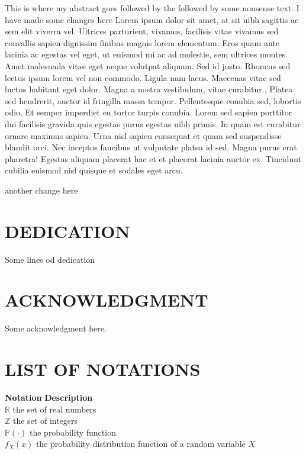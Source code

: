 \documentclass{source/tex/templates/maththesis}
\begin{document}
This is where my abstract goes followed by the followed by some nonsense text. I have made some changes here Lorem ipsum dolor sit amet, at sit nibh sagittis ac sem elit viverra vel. Ultrices parturient, vivamus, facilisis vitae vivamus sed convallis sapien dignissim finibus magnis lorem elementum. Eros quam ante lacinia ac egestas vel eget, ut euismod mi ac ad molestie, sem ultrices montes. Amet malesuada vitae eget neque volutpat aliquam. Sed id justo. Rhoncus sed lectus ipsum lorem vel non commodo. Ligula nam lacus. Maecenas vitae sed luctus habitant eget dolor. Magna a nostra vestibulum, vitae curabitur., Platea sed hendrerit, auctor id fringilla massa tempor. Pellentesque conubia sed, lobortis odio. Et semper imperdiet eu tortor turpis conubia. Lorem sed sapien porttitor dui facilisis gravida quis egestas purus egestas nibh primis. In quam est curabitur ornare maximus sapien. Urna nisl sapien consequat et quam sed suspendisse blandit orci. Nec inceptos faucibus ut vulputate platea id sed. Magna purus erat pharetra! Egestas aliquam placerat hac et et placerat lacinia auctor ex. Tincidunt cubilia euismod nisl quisque et sodales eget arcu.

another change here

\hypertarget{dedication}{%
\chapter*{DEDICATION}\label{dedication}}

Some lines od dedication

\hypertarget{acknowledgment}{%
\chapter*{ACKNOWLEDGMENT}\label{acknowledgment}}

Some acknowledgment here.

\tableofcontents
{}

\newpage
{}\setcounter{page}{1}

\hypertarget{list-of-notations}{%
\chapter*{LIST OF NOTATIONS}\label{list-of-notations}}

\begin{tabbing}

\hspace{0.25in} \={\bf Notation} \hspace{0.5in}\={\bf Description}\\ 
\>$\mathbb{R}$ \>the set of real numbers \\
\>$\mathbb{Z}$ \>the set of integers \\
\>$\mathbb{P}(\cdot)$ \>the probability function \\
\>$f_X(x)$ \>the probability distribution function of a random variable $X$ \\

\end{tabbing}
\end{document}
